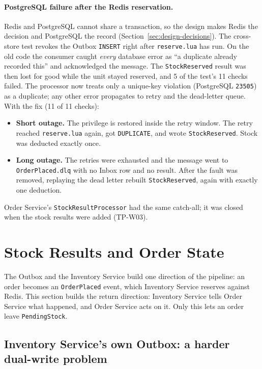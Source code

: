 \documentclass[a4paper]{report}
\begin{document}
\paragraph{PostgreSQL failure after the Redis reservation.} Redis and
PostgreSQL cannot share a transaction, so the design makes Redis the decision
and PostgreSQL the record (Section~\ref{sec:design-decisions}).
The cross-store test revokes the Outbox \texttt{INSERT}
right after \texttt{reserve.lua} has run. On the old code the consumer
caught \emph{every} database error as ``a duplicate already recorded this''
and acknowledged the message. The \texttt{StockReserved} result was then lost
for good while the unit stayed reserved, and 5 of the test's 11 checks failed.
The processor now treats only a unique-key violation (PostgreSQL
\texttt{23505}) as a duplicate; any other error propagates to retry and the
dead-letter queue. With the fix (11 of 11 checks):

\begin{itemize}
  \item \textbf{Short outage.} The privilege is restored inside the retry
    window. The retry reached \texttt{reserve.lua} again, got
    \texttt{DUPLICATE}, and wrote \texttt{StockReserved}. Stock was deducted
    exactly once.
  \item \textbf{Long outage.} The retries were exhausted and the message went
    to \texttt{OrderPlaced.dlq} with no Inbox row and no result. After the
    fault was removed, replaying the dead letter rebuilt
    \texttt{StockReserved}, again with exactly one deduction.
\end{itemize}

Order Service's \texttt{StockResultProcessor} had the same catch-all; it was
closed when the stock results were added (TP-W03).

\section{Stock Results and Order State}
\label{sec:week8}

The Outbox and the Inventory Service build one direction of the pipeline: an order becomes an
\texttt{OrderPlaced} event, which Inventory Service reserves against Redis.
This section builds the return direction: Inventory Service tells Order
Service what happened, and Order Service acts on it. Only this lets an order
leave \texttt{PendingStock}.

\subsection{Inventory Service's own Outbox: a harder dual-write problem}
\end{document}
